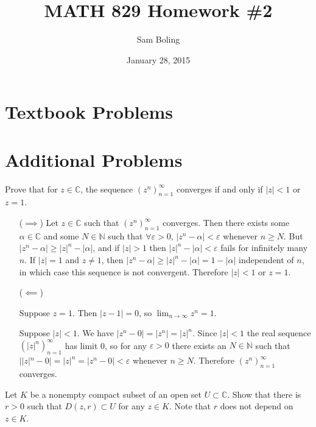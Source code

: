 \documentclass{article}
\title{MATH 829 Homework \#2}
\date{January 28, 2015}
\author{Sam Boling}
\newcounter{Problem}
\newenvironment{Problem}{\begin{Exercise}[name={Problem},
                                          counter={Problem}]}
                        {\end{Exercise}}
\begin{document}
\begin{titlepage}
\maketitle
\end{titlepage}

\section{Textbook Problems}

\section{Additional Problems}

\begin{Problem}
  Prove that for $z \in \mathbb{C}$, the sequence $(z^n)_{n=1}^\infty$
  converges if and only if $|z| < 1$ or $z = 1$.
\end{Problem}

\begin{Answer}
  \begin{itemize}
    \item[($\implies$)]{
      Let $z \in \mathbb{C}$ such that $(z^n)_{n=1}^\infty$ converges.
      Then there exists some $\alpha \in \mathbb{C}$ and some
      $N \in \mathbb{N}$ such that $\forall \varepsilon > 0$,
      $|z^n - \alpha| < \varepsilon$ whenever $n \geq N$.
      But $|z^n - \alpha| \geq |z|^n - |\alpha|$, and if
      $|z| > 1$ then $|z|^n - |\alpha| < \varepsilon$ fails
      for infinitely many $n$. If $|z| = 1$ and $z \neq 1$, then
      $|z^n - \alpha| \geq |z|^n - |\alpha| = 1 - |\alpha|$
      independent of $n$, in which case this sequence is not
      convergent. Therefore $|z| < 1$ or $z = 1$.
    }
    \item[($\impliedby$)]{
      Suppose $z = 1$. Then $|z - 1| = 0$, so
      $\lim_{n \to \infty} z^n = 1$.

      Suppose $|z| < 1$. We have
      $|z^n - 0| = |z^n| = |z|^n$. Since $|z| < 1$
      the real sequence $(|z|^n)_{n=1}^\infty$ has limit
      0, so for any $\varepsilon > 0$ there exists an
      $N \in \mathbb{N}$ such that $||z|^n - 0| = |z|^n = |z^n - 0| < \varepsilon$
      whenever $n \geq N$. Therefore $(z^n)_{n=1}^\infty$ converges.
    }
  \end{itemize}
\end{Answer}

\begin{Problem}
  Let $K$ be a nonempty compact subset of an open set
  $U  \subset \mathbb{C}$. Show that there is $r > 0$
  such that $D(z, r) \subset U$ for any $z \in K$.
  Note that $r$ does not depend on $z \in K$.
\end{Problem}
\end{document}
